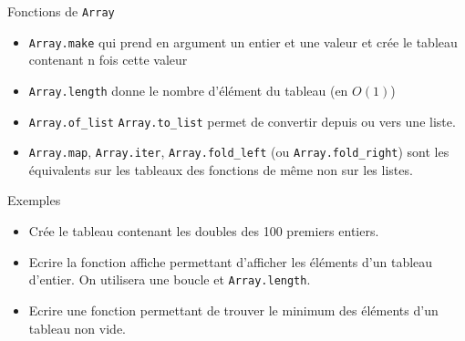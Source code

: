 \documentclass[10pt]{beamer}
\begin{document}
\begin{frame}[fragile]{\Ctitle}{\stitle}
    \begin{block}{Fonctions de {\tt Array}}
    \begin{itemize}
        \item<1-> \texttt{Array.make} qui prend en argument un entier et une valeur et crée le tableau contenant n fois cette valeur
        \item<2-> \texttt{Array.length} donne le nombre d'élément du tableau (en $O(1)$)
        \item<3-> \texttt{Array.of_list} \texttt{Array.to_list} permet de convertir depuis ou vers une liste.
        \item<4-> \texttt{Array.map}, \texttt{Array.iter}, \texttt{Array.fold_left} (ou \texttt{Array.fold_right}) sont les équivalents sur les tableaux des fonctions de même non sur les listes.
    \end{itemize}
\end{block}
\end{frame}

\begin{frame}[fragile]{\Ctitle}{\stitle}
    \begin{exampleblock}{Exemples}
    \begin{itemize}
        \item<1-> Crée le tableau contenant les doubles des 100 premiers entiers.
        \item<2-> Ecrire la fonction affiche permettant d'afficher les éléments d'un tableau d'entier. On utilisera une boucle  et \texttt{Array.length}.
        \item<3-> Ecrire une fonction permettant de trouver le minimum des éléments d'un tableau non vide. 
    \end{itemize}
    \end{exampleblock}
\end{frame}
\end{document}
